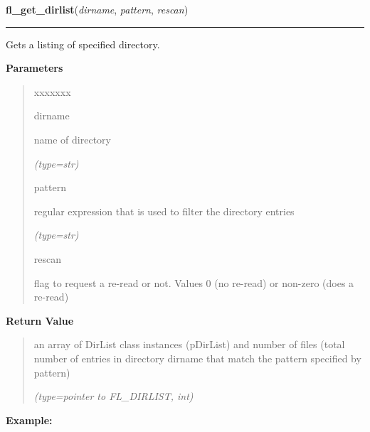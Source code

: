     \vspace{0.5ex}

\hspace{.8\funcindent}\begin{boxedminipage}{\funcwidth}

    \raggedright \textbf{fl\_get\_dirlist}(\textit{dirname}, \textit{pattern}, \textit{rescan})

    \vspace{-1.5ex}

    \rule{\textwidth}{0.5\fboxrule}
\setlength{\parskip}{2ex}
    Gets a listing of specified directory.

\setlength{\parskip}{1ex}
      \textbf{Parameters}
      \vspace{-1ex}

      \begin{quote}
        \begin{Ventry}{xxxxxxx}

          \item[dirname]

          name of directory

            {\it (type=str)}

          \item[pattern]

          regular expression that is used to filter the directory entries

            {\it (type=str)}

          \item[rescan]

          flag to request a re-read or not. Values 0 (no re-read) or 
          non-zero (does a re-read)

        \end{Ventry}

      \end{quote}

      \textbf{Return Value}
    \vspace{-1ex}

      \begin{quote}
      an array of DirList class instances (pDirList) and number of files 
      (total number of entries in directory dirname that match the pattern 
      specified by pattern)

      {\it (type=pointer to FL\_DIRLIST, int)}

      \end{quote}

\textbf{Example:}
\begin{quote}
  \begin{itemize}


\end{itemize}
\end{quote}
\end{boxedminipage}
